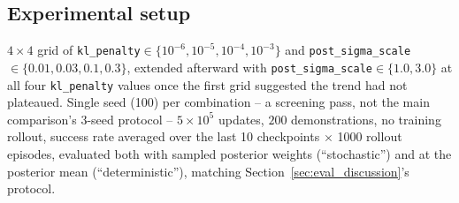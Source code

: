 \documentclass[11pt]{article}
\begin{document}
\subsection{Experimental setup}

$4\times4$ grid of \texttt{kl\_penalty}$\in\{10^{-6},10^{-5},10^{-4},10^{-3}\}$
and \texttt{post\_sigma\_scale}$\in\{0.01,0.03,0.1,0.3\}$, extended afterward
with \texttt{post\_sigma\_scale}$\in\{1.0,3.0\}$ at all four
\texttt{kl\_penalty} values once the first grid suggested the trend had not
plateaued. Single seed (100) per combination -- a screening pass, not the
main comparison's 3-seed protocol -- $5\times10^5$ updates, $200$
demonstrations, no training rollout, success rate averaged over the last 10
checkpoints $\times$ 1000 rollout episodes, evaluated both with sampled
posterior weights (``stochastic'') and at the posterior mean
(``deterministic''), matching Section~\ref{sec:eval_discussion}'s protocol.
\end{document}
